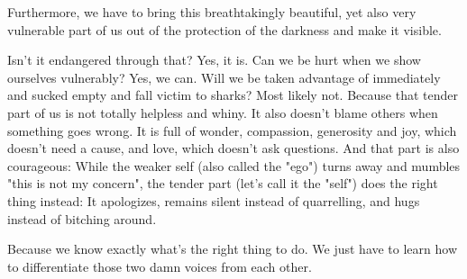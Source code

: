 Furthermore, we have to bring this breathtakingly beautiful, yet also very vulnerable part of us out of the protection of the darkness and make it visible.

Isn't it endangered through that? Yes, it is. Can we be hurt when we show ourselves vulnerably? Yes, we can. Will we be taken advantage of immediately and sucked empty and fall victim to sharks? Most likely not. Because that tender part of us is not totally helpless and whiny. It also doesn't blame others when something goes wrong. It is full of wonder, compassion, generosity and joy, which doesn't need a cause, and love, which doesn't ask questions. And that part is also courageous: While the weaker self (also called the "ego") turns away and mumbles "this is not my concern", the tender part (let's call it the "self") does the right thing instead: It apologizes, remains silent instead of quarrelling, and hugs instead of bitching around.

Because we know exactly what's the right thing to do. We just have to learn how to differentiate those two damn voices from each other.
